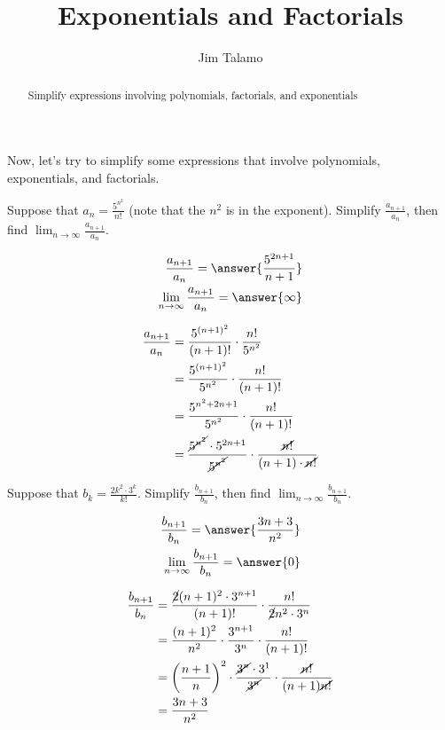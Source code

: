 \documentclass{ximera}
\title[Refresh:]{Exponentials and Factorials}
\author{Jim Talamo}
\begin{document}
\begin{abstract}
  Simplify expressions involving polynomials, factorials, and exponentials
\end{abstract}
\maketitle


\begin{exercise}

Now, let's try to simplify some expressions that involve polynomials, exponentials, and factorials.

Suppose that $a_n = \frac{5^{n^2}}{n!}$ (note that the $n^2$ is in the exponent).  Simplify $\frac{a_{n+1}}{a_n}$, then find $\lim_{n \to \infty} \frac{a_{n+1}}{a_n}$.

\begin{align*}
\frac{a_{n+1}}{a_n} = \answer{ \frac{5^{2n+1}}{n+1}} \\
\lim_{n \to \infty} \frac{a_{n+1}}{a_n} = \answer{\infty}
\end{align*}

\begin{hint}
\begin{align*}
\frac{a_{n+1}}{a_n} &= \frac{5^{(n+1)^2}}{(n+1)!} \cdot \frac{n!}{5^{n^2}} \\
&=  \frac{5^{(n+1)^2}}{5^{n^2}}  \cdot \frac{n!}{(n+1)!} \\
&=  \frac{5^{n^2+2n+1}}{5^{n^2}}  \cdot \frac{n!}{(n+1)!} \\
&=  \frac{\cancel{5^{n^2}} \cdot 5^{2n+1}}{\cancel{5^{n^2}}}  \cdot \frac{\cancel{n!}}{(n+1) \cdot \cancel{n!}} \\
\end{align*}
\end{hint}

Suppose that $b_k = \frac{2k^2 \cdot 3^k}{k!}$. Simplify $\frac{b_{n+1}}{b_n}$, then find $\lim_{n \to \infty} \frac{b_{n+1}}{b_n}$.

\begin{align*}
\frac{b_{n+1}}{b_n} = \answer{  \frac{3n+3}{n^2} } \\
\lim_{n \to \infty} \frac{b_{n+1}}{b_n} = \answer{0}
\end{align*}

\begin{hint}
\begin{align*}
 \frac{b_{n+1}}{b_n} &=  \frac{\cancel{2}(n+1)^2 \cdot 3^{n+1}}{(n+1)!} \cdot \frac{n!} {\cancel{2}n^2 \cdot 3^n} \\
&=  \frac{(n+1)^2}{n^2} \cdot \frac{3^{n+1}}{3^n} \cdot \frac{n!}{(n+1)!} \\
&=  \left(\frac{n+1}{n}\right)^2 \cdot \frac{\cancel{3^n} \cdot 3^1}{\cancel{3^n}} \cdot \frac{\cancel{n!}}{(n+1)\cancel{n!}} \\
&=  \frac{3n+3}{n^2} \\
\end{align*}

\end{hint}


\end{exercise}
\end{document}
